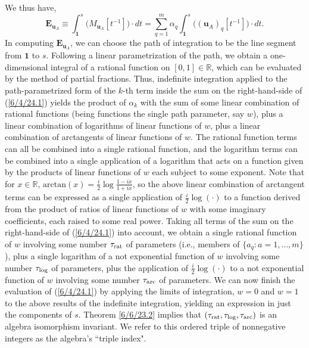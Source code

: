 \documentclass{amsart}
\numberwithin{equation}{section}
\theoremstyle{definition}
\numberwithin{theorem}{section}
\begin{document}
We thus have, \begin{equation}\label{6/4/24.1} \mathbf{E}_{\mathbf{u}_A} \equiv \int_{\mathbf{1}}^s\big(M_{\mathbf{u}_A}[t^{-1}]\big)\cdot dt = \sum_{q=1}^m\alpha_q\int_{\mathbf{1}}^s  \big((\mathbf{u}_A)_q[t^{-1}]\big) \cdot dt.\end{equation}   In computing $\mathbf{E}_{\mathbf{u}_A}$, we can choose the path of integration to be the line segment from $\mathbf{1}$ to $s$. 
Following a linear parametrization of the path, we obtain a one-dimensional integral of a rational function on $[0,1]\in\mathbb{R}$,
which can be evaluated by the method of partial fractions. 
 Thus, indefinite integration applied to the path-parametrized form of the $k$-th term inside the sum on the right-hand-side of (\ref{6/4/24.1}) yields the product of $\alpha_k$ with  
the sum of some linear combination of rational functions (being functions the single path parameter, say $w$), plus a linear combination of logarithms of linear functions of $w$, plus a linear combination of arctangents of linear functions of $w$.  The rational function terms can all be combined into a single rational function, and the logarithm terms can be combined into a single application of a logarithm that acts on a function given by the products of linear functions of $w$ each subject to some exponent.  Note that for $x\in\mathbb{R}$, $\mbox{arctan}(x) = \frac{i}{2}\log\frac{1-ix}{1+ix}$, so the above linear combination of arctangent terms can be expressed as a single application of $\frac{i}{2}\log(\cdot)$ to a function derived from the product of ratios of linear functions of $w$ with some imaginary coefficients, each raised to some real power.   Taking all terms of the sum on the right-hand-side of (\ref{6/4/24.1}) into account, we obtain a single rational function of $w$ involving some number $\tau_{\rm rat}$ of parameters (i.e., members of $\{a_q:a=1,\dots,m\}$), plus a single logarithm of a not exponential function of $w$ involving some number $\tau_{\rm log}$ of parameters, plus the application of $\frac{i}{2}\log (\cdot)$ to a not exponential function of $w$ involving some number $\tau_{\rm arc}$ of parameters.  We can now finish the evaluation of (\ref{6/4/24.1}) by applying the limits of integration, $w=0$ and $w=1$ to the above results of the indefinite integration, yielding an expression in just the components of $s$.   Theorem \ref{6/6/23.2} implies that $(\tau_{\rm rat},\tau_{\rm log},\tau_{\rm arc})$ is an algebra isomorphism invariant.  We refer to this ordered triple of nonnegative integers as the algebra's ``triple index".
\end{document}
